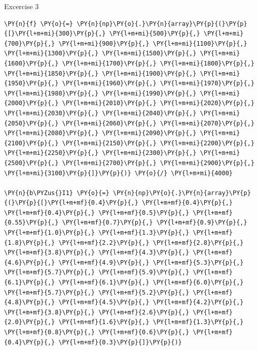     Excercise 3

    \begin{tcolorbox}[breakable, size=fbox, boxrule=1pt, pad at break*=1mm,colback=cellbackground, colframe=cellborder]
\begin{Verbatim}[commandchars=\\\{\}]
\PY{n}{f} \PY{o}{=} \PY{n}{np}\PY{o}{.}\PY{n}{array}\PY{p}{(}\PY{p}{[}\PY{l+m+mi}{300}\PY{p}{,} \PY{l+m+mi}{500}\PY{p}{,} \PY{l+m+mi}{700}\PY{p}{,} \PY{l+m+mi}{900}\PY{p}{,} \PY{l+m+mi}{1100}\PY{p}{,} \PY{l+m+mi}{1300}\PY{p}{,} \PY{l+m+mi}{1500}\PY{p}{,} \PY{l+m+mi}{1600}\PY{p}{,} \PY{l+m+mi}{1700}\PY{p}{,} \PY{l+m+mi}{1800}\PY{p}{,} \PY{l+m+mi}{1850}\PY{p}{,} \PY{l+m+mi}{1900}\PY{p}{,} \PY{l+m+mi}{1950}\PY{p}{,} \PY{l+m+mi}{1960}\PY{p}{,} \PY{l+m+mi}{1970}\PY{p}{,} \PY{l+m+mi}{1980}\PY{p}{,} \PY{l+m+mi}{1990}\PY{p}{,} \PY{l+m+mi}{2000}\PY{p}{,} \PY{l+m+mi}{2010}\PY{p}{,} \PY{l+m+mi}{2020}\PY{p}{,} \PY{l+m+mi}{2030}\PY{p}{,} \PY{l+m+mi}{2040}\PY{p}{,} \PY{l+m+mi}{2050}\PY{p}{,} \PY{l+m+mi}{2060}\PY{p}{,} \PY{l+m+mi}{2070}\PY{p}{,} \PY{l+m+mi}{2080}\PY{p}{,} \PY{l+m+mi}{2090}\PY{p}{,} \PY{l+m+mi}{2100}\PY{p}{,} \PY{l+m+mi}{2150}\PY{p}{,} \PY{l+m+mi}{2200}\PY{p}{,} \PY{l+m+mi}{2250}\PY{p}{,} \PY{l+m+mi}{2300}\PY{p}{,} \PY{l+m+mi}{2500}\PY{p}{,} \PY{l+m+mi}{2700}\PY{p}{,} \PY{l+m+mi}{2900}\PY{p}{,} \PY{l+m+mi}{3100}\PY{p}{]}\PY{p}{)} \PY{o}{/} \PY{l+m+mi}{4000}

\PY{n}{b\PYZus{}I1} \PY{o}{=} \PY{n}{np}\PY{o}{.}\PY{n}{array}\PY{p}{(}\PY{p}{[}\PY{l+m+mf}{0.4}\PY{p}{,} \PY{l+m+mf}{0.4}\PY{p}{,} \PY{l+m+mf}{0.4}\PY{p}{,} \PY{l+m+mf}{0.5}\PY{p}{,} \PY{l+m+mf}{0.55}\PY{p}{,} \PY{l+m+mf}{0.7}\PY{p}{,} \PY{l+m+mf}{0.9}\PY{p}{,} \PY{l+m+mf}{1.0}\PY{p}{,} \PY{l+m+mf}{1.3}\PY{p}{,} \PY{l+m+mf}{1.8}\PY{p}{,} \PY{l+m+mf}{2.2}\PY{p}{,} \PY{l+m+mf}{2.8}\PY{p}{,} \PY{l+m+mf}{3.8}\PY{p}{,} \PY{l+m+mf}{4.3}\PY{p}{,} \PY{l+m+mf}{4.6}\PY{p}{,} \PY{l+m+mf}{4.9}\PY{p}{,} \PY{l+m+mf}{5.3}\PY{p}{,} \PY{l+m+mf}{5.7}\PY{p}{,} \PY{l+m+mf}{5.9}\PY{p}{,} \PY{l+m+mf}{6.1}\PY{p}{,} \PY{l+m+mf}{6.1}\PY{p}{,} \PY{l+m+mf}{6.0}\PY{p}{,} \PY{l+m+mf}{5.7}\PY{p}{,} \PY{l+m+mf}{5.2}\PY{p}{,} \PY{l+m+mf}{4.8}\PY{p}{,} \PY{l+m+mf}{4.5}\PY{p}{,} \PY{l+m+mf}{4.2}\PY{p}{,} \PY{l+m+mf}{3.8}\PY{p}{,} \PY{l+m+mf}{2.6}\PY{p}{,} \PY{l+m+mf}{2.0}\PY{p}{,} \PY{l+m+mf}{1.6}\PY{p}{,} \PY{l+m+mf}{1.3}\PY{p}{,} \PY{l+m+mf}{0.8}\PY{p}{,} \PY{l+m+mf}{0.6}\PY{p}{,} \PY{l+m+mf}{0.4}\PY{p}{,} \PY{l+m+mf}{0.3}\PY{p}{]}\PY{p}{)}


\end{Verbatim}
\end{tcolorbox}

